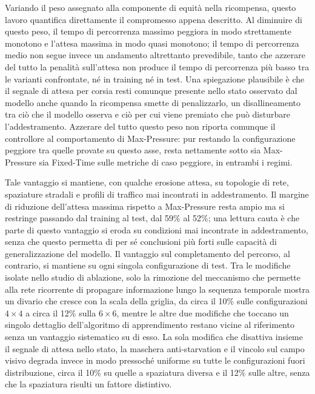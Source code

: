 Variando il peso assegnato alla componente di equità nella ricompensa,
questo lavoro quantifica direttamente il compromesso appena descritto. Al
diminuire di questo peso, il tempo di percorrenza massimo peggiora in
modo strettamente monotono e l'attesa massima in modo quasi monotono; il
tempo di percorrenza medio non segue invece un andamento altrettanto
prevedibile, tanto che azzerare del tutto la penalità sull'attesa non
produce il tempo di percorrenza più basso tra le varianti confrontate, né
in training né in test. Una spiegazione plausibile è che il segnale di
attesa per corsia resti comunque presente nello stato osservato dal
modello anche quando la ricompensa smette di penalizzarlo, un
disallineamento tra ciò che il modello osserva e ciò per cui viene
premiato che può disturbare l'addestramento. Azzerare del tutto questo
peso non riporta comunque il controllore al comportamento di
Max-Pressure: pur restando la configurazione peggiore tra quelle provate
su questo asse, resta nettamente sotto sia Max-Pressure sia Fixed-Time
sulle metriche di caso peggiore, in entrambi i regimi.

Tale vantaggio si mantiene, con qualche erosione attesa, su topologie di
rete, spaziature stradali e profili di traffico mai incontrati in
addestramento. Il margine di riduzione dell'attesa massima rispetto a
Max-Pressure resta ampio ma si restringe passando dal training al test,
dal 59\% al 52\%; una lettura cauta è che parte di questo vantaggio si
eroda su condizioni mai incontrate in addestramento, senza che questo
permetta di per sé conclusioni più forti sulle capacità di
generalizzazione del modello. Il vantaggio sul completamento del
percorso, al contrario, si mantiene su ogni singola configurazione di
test. Tra le modifiche isolate nello studio di ablazione, solo la
rimozione del meccanismo che permette alla rete ricorrente di propagare
informazione lungo la sequenza temporale mostra un divario che cresce con
la scala della griglia, da circa il 10\% sulle configurazioni $4\times4$
a circa il 12\% sulla $6\times6$, mentre le altre due modifiche che
toccano un singolo dettaglio dell'algoritmo di apprendimento restano
vicine al riferimento senza un vantaggio sistematico su di esso. La sola
modifica che disattiva insieme il segnale di attesa nello stato, la
maschera anti-starvation e il vincolo sul campo visivo degrada invece in
modo pressoché uniforme su tutte le configurazioni fuori distribuzione,
circa il 10\% su quelle a spaziatura diversa e il 12\% sulle altre, senza
che la spaziatura risulti un fattore distintivo.

